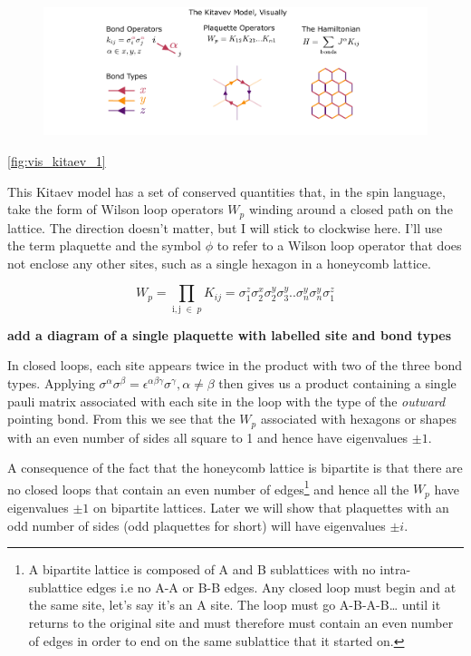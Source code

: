 \begin{figure}
\hypertarget{fig:visual_kitaev_1}{%
\centering
\includegraphics[width=1\textwidth,height=\textheight]{figure_code/amk_chapter/visual_kitaev_1.pdf}
\caption{}\label{fig:visual_kitaev_1}
}
\end{figure}

\ref{fig:vis_kitaev_1}

This Kitaev model has a set of conserved quantities that, in the spin
language, take the form of Wilson loop operators \(W_p\) winding around
a closed path on the lattice. The direction doesn't matter, but I will
stick to clockwise here. I'll use the term plaquette and the symbol
\(\phi\) to refer to a Wilson loop operator that does not enclose any
other sites, such as a single hexagon in a honeycomb lattice.

\[W_p = \prod_{\mathrm{i,j}\; \in\; p} K_{ij} = \sigma_1^z \sigma_2^x \sigma_2^y \sigma_3^y .. \sigma_n^y \sigma_n^y \sigma_1^z\]

\textbf{add a diagram of a single plaquette with labelled site and bond
types}

In closed loops, each site appears twice in the product with two of the
three bond types. Applying
\(\sigma^\alpha \sigma^\beta = \epsilon^{\alpha \beta \gamma} \sigma^\gamma, \alpha \neq \beta\)
then gives us a product containing a single pauli matrix associated with
each site in the loop with the type of the \emph{outward} pointing bond.
From this we see that the \(W_p\) associated with hexagons or shapes
with an even number of sides all square to 1 and hence have eigenvalues
\(\pm 1\).

A consequence of the fact that the honeycomb lattice is bipartite is
that there are no closed loops that contain an even number of
edges\footnote{A bipartite lattice is composed of A and B sublattices
  with no intra-sublattice edges i.e no A-A or B-B edges. Any closed
  loop must begin and at the same site, let's say it's an A site. The
  loop must go A-B-A-B\ldots{} until it returns to the original site and
  must therefore must contain an even number of edges in order to end on
  the same sublattice that it started on.} and hence all the \(W_p\)
have eigenvalues \(\pm 1\) on bipartite lattices. Later we will show
that plaquettes with an odd number of sides (odd plaquettes for short)
will have eigenvalues \(\pm i\).

